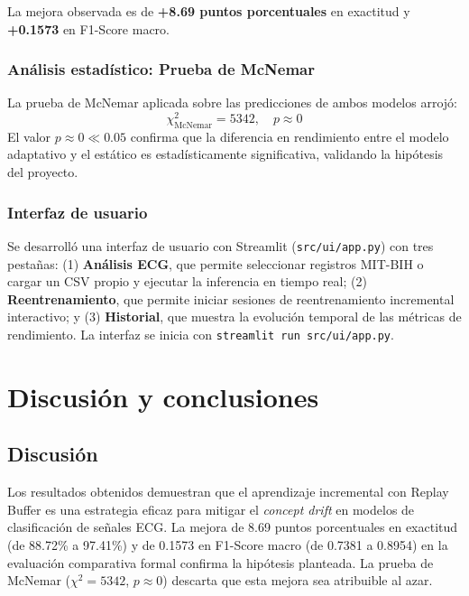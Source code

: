 \documentclass[11pt,spanish]{citedi}
\begin{document}
La mejora observada es de \textbf{+8.69 puntos porcentuales} en exactitud y \textbf{+0.1573} en F1-Score macro.

\subsection{Análisis estadístico: Prueba de McNemar}

La prueba de McNemar aplicada sobre las predicciones de ambos modelos arrojó:
\begin{equation}
\chi^2_{\text{McNemar}} = 5342, \quad p \approx 0
\end{equation}
El valor $p \approx 0 \ll 0.05$ confirma que la diferencia en rendimiento entre el modelo adaptativo y el estático es estadísticamente significativa, validando la hipótesis del proyecto.

\subsection{Interfaz de usuario}

Se desarrolló una interfaz de usuario con Streamlit (\texttt{src/ui/app.py}) con tres pestañas: (1) \textbf{Análisis ECG}, que permite seleccionar registros MIT-BIH o cargar un CSV propio y ejecutar la inferencia en tiempo real; (2) \textbf{Reentrenamiento}, que permite iniciar sesiones de reentrenamiento incremental interactivo; y (3) \textbf{Historial}, que muestra la evolución temporal de las métricas de rendimiento. La interfaz se inicia con \texttt{streamlit run src/ui/app.py}.

\chapter{Discusión y conclusiones}

\section{Discusión}

Los resultados obtenidos demuestran que el aprendizaje incremental con Replay Buffer es una estrategia eficaz para mitigar el \textit{concept drift} en modelos de clasificación de señales ECG. La mejora de 8.69 puntos porcentuales en exactitud (de 88.72\% a 97.41\%) y de 0.1573 en F1-Score macro (de 0.7381 a 0.8954) en la evaluación comparativa formal confirma la hipótesis planteada. La prueba de McNemar ($\chi^2 = 5342$, $p \approx 0$) descarta que esta mejora sea atribuible al azar.
\end{document}
